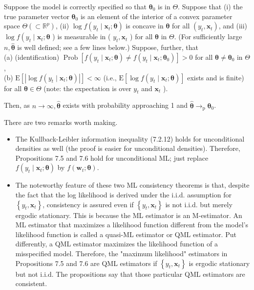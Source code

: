 \documentclass[10pt]{article}
\begin{document}
Suppose the model is correctly specified so that $\boldsymbol{\theta}_{0}$ is in $\Theta$. Suppose that (i) the true parameter vector $\boldsymbol{\theta}_{0}$ is an element of the interior of a convex parameter space $\Theta\left(\subset \mathbb{R}^{p}\right)$, (ii) $\log f\left(y_{t} \mid \mathbf{x}_{t} ; \boldsymbol{\theta}\right)$ is concave in $\boldsymbol{\theta}$ for all $\left(y_{t}, \mathbf{x}_{t}\right)$, and (iii) $\log f\left(y_{t} \mid\right. \mathbf{x}_{t} ; \boldsymbol{\theta}$ ) is measurable in ( $y_{t}, \mathbf{x}_{t}$ ) for all $\boldsymbol{\theta}$ in $\Theta$. (For sufficiently large $n, \hat{\boldsymbol{\theta}}$ is well defined; see a few lines below.) Suppose, further, that\\
(a) (identification) $\operatorname{Prob}\left[f\left(y_{t} \mid \mathbf{x}_{t} ; \boldsymbol{\theta}\right) \neq f\left(y_{t} \mid \mathbf{x}_{t} ; \boldsymbol{\theta}_{0}\right)\right]>0$ for all $\boldsymbol{\theta} \neq \boldsymbol{\theta}_{0}$ in $\Theta$,\\
(b) $\mathrm{E}\left[\left|\log f\left(y_{t} \mid \mathbf{x}_{t} ; \boldsymbol{\theta}\right)\right|\right]<\infty$ (i.e., $\mathrm{E}\left[\log f\left(y_{t} \mid \mathbf{x}_{t} ; \boldsymbol{\theta}\right)\right]$ exists and is finite) for all $\boldsymbol{\theta} \in \Theta$ (note: the expectation is over $y_{t}$ and $\mathbf{x}_{t}$ ).

Then, as $n \rightarrow \infty, \hat{\boldsymbol{\theta}}$ exists with probability approaching 1 and $\hat{\boldsymbol{\theta}} \rightarrow_{\mathrm{p}} \boldsymbol{\theta}_{0}$.

There are two remarks worth making.

\begin{itemize}
  \item The Kullback-Leibler information inequality (7.2.12) holds for unconditional densities as well (the proof is easier for unconditional densities). Therefore, Propositions 7.5 and 7.6 hold for unconditional ML; just replace $f\left(y_{t} \mid \mathbf{x}_{t} ; \boldsymbol{\theta}\right)$ by $f\left(\mathbf{w}_{t} ; \boldsymbol{\theta}\right)$.
  \item The noteworthy feature of these two ML consistency theorems is that, despite the fact that the log likelihood is derived under the i.i.d. assumption for $\left\{y_{t}, \mathbf{x}_{t}\right\}$, consistency is assured even if $\left\{y_{t}, \mathbf{x}_{t}\right\}$ is not i.i.d. but merely ergodic stationary. This is because the ML estimator is an M-estimator. An ML estimator that maximizes a likelihood function different from the model's likelihood function is called a quasi-ML estimator or QML estimator. Put differently, a QML estimator maximizes the likelihood function of a misspecified model. Therefore, the "maximum likelihood" estimators in Propositions 7.5 and 7.6 are QML estimators if $\left\{y_{t}, \mathbf{x}_{t}\right\}$ is ergodic stationary but not i.i.d. The propositions say that those particular QML estimators are consistent.
\end{itemize}
\end{document}
